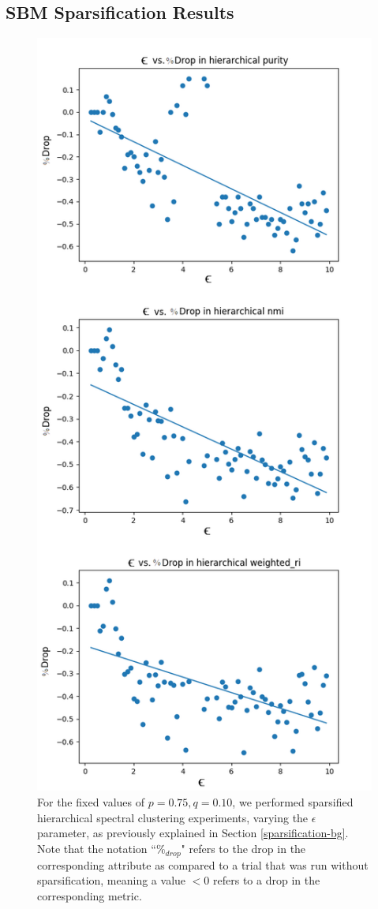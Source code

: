 \documentclass{article}
\begin{document}
\subsection{SBM Sparsification Results}

\begin{figure}[H]
    \label{fig:results_hierarchical_sparsify}
    \centering
    \includegraphics[width=.55\textwidth]{results/results_hierarchical_sparsify.png}
    \caption[Sparsified hierarchical spectral clustering for $p=0.75,q=0.10$]{For the fixed values of $p=0.75,q=0.10$, we performed sparsified hierarchical spectral clustering experiments, varying the $\epsilon$ parameter, as previously explained in Section \ref{sparsification-bg}. Note that the notation ``$\%_{drop}$" refers to the drop in the corresponding attribute as compared to a trial that was run without sparsification, meaning a value $<0$ refers to a drop in the corresponding metric.}
\end{figure}
\end{document}

